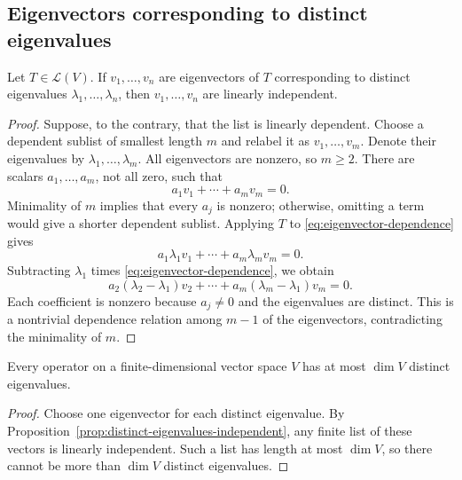 \subsection{Eigenvectors corresponding to distinct eigenvalues}

\begin{proposition}\label{prop:distinct-eigenvalues-independent}
  Let $T\in\mathcal L(V)$. If $v_1,\ldots,v_n$ are eigenvectors
  of $T$ corresponding to distinct eigenvalues
  $\lambda_1,\ldots,\lambda_n$, then $v_1,\ldots,v_n$ are
  linearly independent.
\end{proposition}

\begin{proof}
  Suppose, to the contrary, that the list is linearly dependent.
  Choose a dependent sublist of smallest length $m$ and relabel
  it as $v_1,\ldots,v_m$. Denote their eigenvalues by
  $\lambda_1,\ldots,\lambda_m$. All eigenvectors are nonzero,
  so $m\geq2$. There are scalars $a_1,\ldots,a_m$, not
  all zero, such that
  \begin{equation}\label{eq:eigenvector-dependence}
    a_1v_1+\cdots+a_mv_m=0.
  \end{equation}
  Minimality of $m$ implies that every $a_j$ is nonzero;
  otherwise, omitting a term would give a shorter dependent
  sublist. Applying $T$ to
  \eqref{eq:eigenvector-dependence} gives
  \[
    a_1\lambda_1v_1+\cdots+a_m\lambda_mv_m=0.
  \]
  Subtracting $\lambda_1$ times
  \eqref{eq:eigenvector-dependence}, we obtain
  \[
    a_2(\lambda_2-\lambda_1)v_2
      +\cdots+a_m(\lambda_m-\lambda_1)v_m=0.
  \]
  Each coefficient is nonzero because $a_j\neq0$ and the
  eigenvalues are distinct. This is a nontrivial dependence
  relation among $m-1$ of the eigenvectors, contradicting the
  minimality of $m$.
\end{proof}

\begin{corollary}\label{cor:eigenvalue-count-bound}
  Every operator on a finite-dimensional vector space $V$ has
  at most $\dim V$ distinct eigenvalues.
\end{corollary}

\begin{proof}
  Choose one eigenvector for each distinct eigenvalue. By
  Proposition~\ref{prop:distinct-eigenvalues-independent}, any
  finite list of these vectors is linearly independent. Such a
  list has length at most $\dim V$, so there cannot be more
  than $\dim V$ distinct eigenvalues.
\end{proof}
